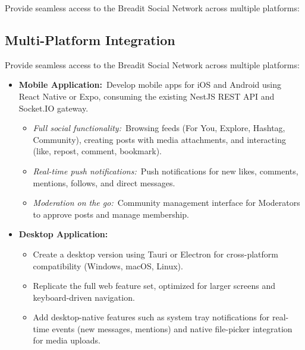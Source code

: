 Provide seamless access to the Breadit Social Network across multiple platforms:

\subsection{Multi-Platform Integration}

Provide seamless access to the Breadit Social Network across multiple platforms:
\begin{itemize}
  \item \textbf{Mobile Application:}~Develop mobile apps for iOS and Android using React Native or Expo, consuming the existing NestJS REST API and Socket.IO gateway.
\begin{itemize}
  \item \textit{Full social functionality:}~Browsing feeds (For You, Explore, Hashtag, Community), creating posts with media attachments, and interacting (like, repost, comment, bookmark).
  \item \textit{Real-time push notifications:}~Push notifications for new likes, comments, mentions, follows, and direct messages.
  \item \textit{Moderation on the go:}~Community management interface for Moderators to approve posts and manage membership.
\end{itemize}
  \item \textbf{Desktop Application:}
\begin{itemize}
  \item Create a desktop version using Tauri or Electron for cross-platform compatibility (Windows, macOS, Linux).
  \item Replicate the full web feature set, optimized for larger screens and keyboard-driven navigation.
  \item Add desktop-native features such as system tray notifications for real-time events (new messages, mentions) and native file-picker integration for media uploads.
\end{itemize}
\end{itemize}

